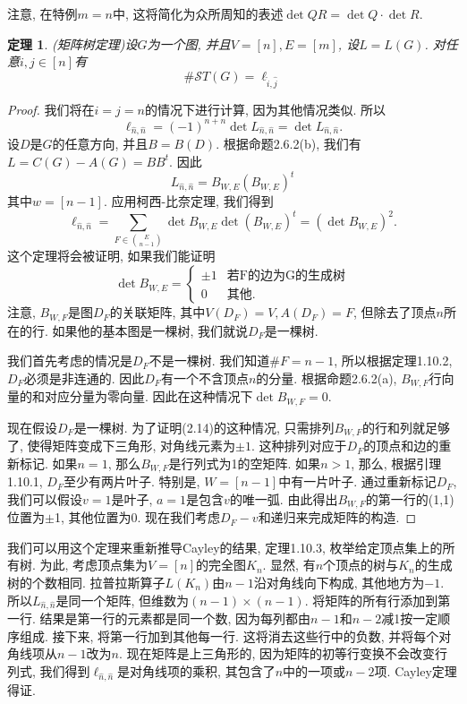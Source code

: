 \documentclass{ctexbook}
\newtheorem{thm}{定理}[section]
\begin{document}
	注意, 在特例$m=n$中, 这将简化为众所周知的表述$\operatorname{det}QR=\operatorname{det}Q\cdot \operatorname{det}R$.
\begin{thm}
	(矩阵树定理)设$G$为一个图, 并且$V=[n],E=[m]$, 设$L=L(G)$. 对任意$i,j\in [n]$有
	\[
	\#\mathcal{S}T(G)=\ell_{\hat{i},\hat{j}}
	\]
\end{thm}
\begin{proof}
	我们将在$i=j=n$的情况下进行计算, 因为其他情况类似. 所以
	\[
	\ell_{\hat{n},\hat{n}}=(-1)^{n+n}\operatorname{det}L_{\hat{n},\hat{n}}=\operatorname{det}L_{\hat{n},\hat{n}}.
	\]
	设$D$是$G$的任意方向, 并且$B=B(D)$. 根据命题2.6.2(b), 我们有$L=C(G)-A(G)=BB^{t}$. 因此
	\[
	L_{\hat{n},\hat{n}}=B_{W,E}(B_{W,E})^{t}
	\]
	其中$w=[n-1]$. 应用柯西-比奈定理, 我们得到
	\[
	\ell_{\hat{n},\hat{n}}=\sum_{F\in \binom{E}{n-1}}\operatorname{det}B_{W,E}\operatorname{det}(B_{W,E})^{t}=(\operatorname{det}B_{W,E})^{2}.
	\]
	这个定理将会被证明, 如果我们能证明
	\begin{equation}
	\operatorname{det}B_{W,E}=\left\{\begin{array}{cc}
	\pm1 & \text{若F的边为G的生成树}\\
	0 & \text{其他.}
	\end{array}\right.
	\end{equation}
	注意, $B_{W,F}$是图$D_{F}$的关联矩阵, 其中$V(D_{F})=V,A(D_{F})=F$, 但除去了顶点$n$所在的行. 如果他的基本图是一棵树, 我们就说$D_{F}$是一棵树.
	
	我们首先考虑的情况是$D_{F}$不是一棵树. 我们知道$\# F=n-1$, 所以根据定理1.10.2, $D_{F}$必须是非连通的. 因此$D_{F}$有一个不含顶点$n$的分量. 根据命题2.6.2(a), $B_{W,F}$行向量的和对应分量为零向量. 因此在这种情况下$\operatorname{det}B_{W,F}=0$.
	
	现在假设$D_{F}$是一棵树. 为了证明(2.14)的这种情况, 只需排列$B_{W,F}$的行和列就足够了, 使得矩阵变成下三角形, 对角线元素为$\pm 1$. 这种排列对应于$D_{F}$的顶点和边的重新标记. 如果$n=1$, 那么$B_{W,F}$是行列式为1的空矩阵. 如果$n>1$, 那么, 根据引理1.10.1, $D_{F}$至少有两片叶子. 特别是, $W=[n-1]$中有一片叶子. 通过重新标记$D_{F}$, 我们可以假设$v=1$是叶子, $a=1$是包含$v$的唯一弧. 由此得出$B_{W,F}$的第一行的(1,1)位置为$\pm$1, 其他位置为0. 现在我们考虑$D_{F}-v$和递归来完成矩阵的构造.
\end{proof}

	我们可以用这个定理来重新推导Cayley的结果, 定理1.10.3, 枚举给定顶点集上的所有树. 为此, 考虑顶点集为$V=[n]$的完全图$K_{n}$. 显然, 有$n$个顶点的树与$K_{n}$的生成树的个数相同. 拉普拉斯算子$L(K_{n})$由$n-1$沿对角线向下构成, 其他地方为$-1$. 所以$L_{\hat{n},\hat{n}}$是同一个矩阵, 但维数为$(n-1)\times (n-1)$. 将矩阵的所有行添加到第一行. 结果是第一行的元素都是同一个数, 因为每列都由$n-1$和$n-2$减1按一定顺序组成. 接下来, 将第一行加到其他每一行. 这将消去这些行中的负数, 并将每个对角线项从$n-1$改为$n$. 现在矩阵是上三角形的, 因为矩阵的初等行变换不会改变行列式, 我们得到$\ell_{\hat{n},\hat{n}}$是对角线项的乘积, 其包含了$n$中的一项或$n-2$项. Cayley定理得证.
	
\end{document}
